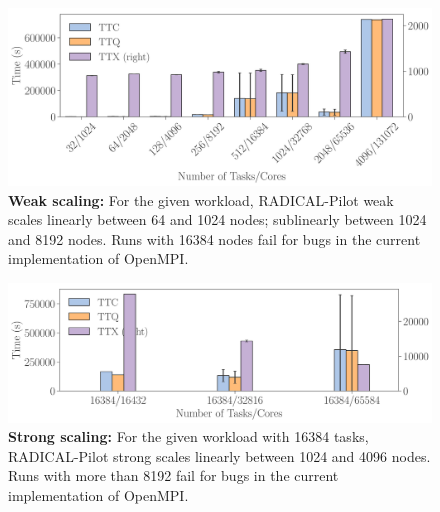 \documentclass{article}
\begin{document}


\begin{figure}
  \centering
  \includegraphics[width=\columnwidth]{figures/screen_titan_rp_synapse_weak_scaling.png}
  \caption{\textbf{Weak scaling:} For the given workload, RADICAL-Pilot
	weak scales linearly between 64 and 1024 nodes; sublinearly between 1024
	and 8192 nodes. Runs with 16384 nodes fail for bugs in the current
	implementation of OpenMPI. }\label{fig:ws-ttc}
\end{figure}

\begin{figure}
  \centering
  \includegraphics[width=\columnwidth]{figures/screen_titan_rp_synapse_strong_scaling.png}
  \caption{\textbf{Strong scaling:} For the given workload with 16384 tasks,
	RADICAL-Pilot strong scales linearly between 1024 and 4096 nodes. Runs
	with more than 8192 fail for bugs in the current implementation of
	OpenMPI.}\label{fig:ss-ttc}
\end{figure}
\end{document}
